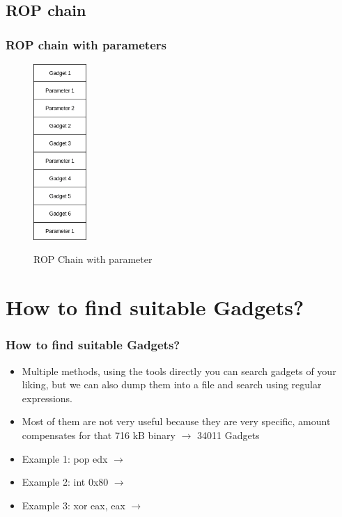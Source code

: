 \documentclass[11pt]{beamer}
\begin{document}
\subsection{ROP chain}
\begin{frame}
    \frametitle{ROP chain with parameters}
    \begin{figure}[h]
        \caption{ROP Chain with parameter}
        \centering
        \includegraphics[width=0.18\textwidth]{./img/gadgetstack.png}\label{gadget2}
    \end{figure}
\end{frame}

\section{How to find suitable Gadgets?}
\begin{frame}
    \frametitle{How to find suitable Gadgets?}
    \begin{itemize}
    \item Multiple methods, using the tools directly you can search gadgets of your liking, but we can also dump them into a file and search using regular expressions.
    \end{itemize}
    \begin{itemize}
        \item Most of them are not very useful because they are very specific, amount compensates for that 716 kB binary $\rightarrow$ 34011 Gadgets
        \item Example 1: pop edx $\rightarrow$ 
        \item Example 2: int 0x80 $\rightarrow$ 
        \item Example 3: xor eax, eax $\rightarrow$ 
    \end{itemize}
\end{frame}
\end{document}
